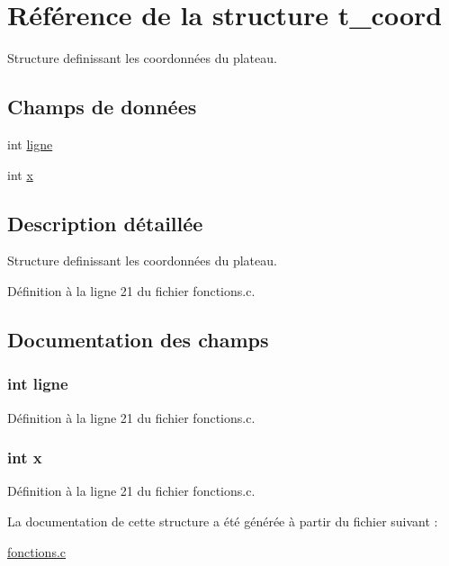 \hypertarget{structt__coord}{\section{Référence de la structure t\-\_\-coord}
\label{structt__coord}
}


Structure definissant les coordonnées du plateau.  


\subsection*{Champs de données}
\begin{DoxyCompactItemize}
\item 
int \hyperlink{structt__coord_a66af32d3d7b5e0efd6db373c0813e7dd}{ligne}
\item 
int \hyperlink{structt__coord_a6150e0515f7202e2fb518f7206ed97dc}{x}
\end{DoxyCompactItemize}


\subsection{Description détaillée}
Structure definissant les coordonnées du plateau. 

Définition à la ligne 21 du fichier fonctions.\-c.



\subsection{Documentation des champs}
\hypertarget{structt__coord_a66af32d3d7b5e0efd6db373c0813e7dd}{
\subsubsection[{ligne}]{\setlength{\rightskip}{0pt plus 5cm}int ligne}}\label{structt__coord_a66af32d3d7b5e0efd6db373c0813e7dd}


Définition à la ligne 21 du fichier fonctions.\-c.

\hypertarget{structt__coord_a6150e0515f7202e2fb518f7206ed97dc}{
\subsubsection[{x}]{\setlength{\rightskip}{0pt plus 5cm}int x}}\label{structt__coord_a6150e0515f7202e2fb518f7206ed97dc}


Définition à la ligne 21 du fichier fonctions.\-c.



La documentation de cette structure a été générée à partir du fichier suivant \-:\begin{DoxyCompactItemize}
\item 
\hyperlink{fonctions_8c}{fonctions.\-c}\end{DoxyCompactItemize}
